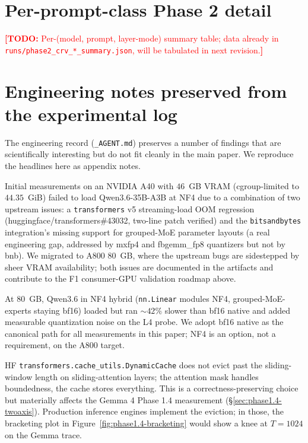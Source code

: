 \documentclass[11pt,letterpaper]{article}
\newcommand{\TODO}[1]{\textcolor{red}{\textbf{[TODO:} #1\textbf{]}}}
\begin{document}
\section{Per-prompt-class Phase 2 detail}
\label{app:phase2-percell}


\TODO{Per-(model, prompt, layer-mode) summary table; data already in
\texttt{runs/phase2\_crv\_*\_summary.json}, will be tabulated in next
revision.}

\section{Engineering notes preserved from the experimental log}
\label{app:eng-notes}

The engineering record (\verb|_AGENT.md|) preserves a number of
findings that are scientifically interesting but do not fit cleanly in
the main paper. We reproduce the headlines here as appendix notes.

\begin{description}[leftmargin=1.2em, itemsep=4pt]
\item[Hardware history.] Initial measurements on an NVIDIA A40 with
$46$~GB VRAM (cgroup-limited to $44.35$~GiB) failed to load
Qwen3.6-35B-A3B at NF4 due to a combination of two upstream issues: a
\texttt{transformers} v5 streaming-load OOM regression
(huggingface/transformers\#43032, two-line patch verified) and the
\texttt{bitsandbytes} integration's missing support for grouped-MoE
parameter layouts (a real engineering gap, addressed by mxfp4 and
fbgemm\_fp8 quantizers but not by bnb). We migrated to A800 80~GB,
where the upstream bugs are sidestepped by sheer VRAM availability;
both issues are documented in the artifacts and contribute to the F1
consumer-GPU validation roadmap above.
\item[Quantization paths.] At $80$~GB, Qwen3.6 in NF4 hybrid
(\texttt{nn.Linear} modules NF4, grouped-MoE-experts staying bf16)
loaded but ran $\sim 42\%$ slower than bf16 native and added measurable
quantization noise on the L4 probe. We adopt bf16 native as the
canonical path for all measurements in this paper; NF4 is an option,
not a requirement, on the A800 target.
\item[Sliding-window cache eviction.] HF
\texttt{transformers.cache\_utils.DynamicCache} does not evict past
the sliding-window length on sliding-attention layers; the attention
mask handles boundedness, the cache stores everything. This is a
correctness-preserving choice but materially affects the Gemma 4
Phase 1.4 measurement (\S\ref{sec:phase1.4-twoaxis}). Production
inference engines implement the eviction; in those, the bracketing
plot in Figure~\ref{fig:phase1.4-bracketing} would show a knee at
$T = 1024$ on the Gemma trace.
\end{description}
\end{document}
